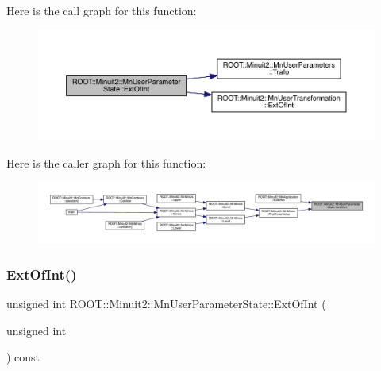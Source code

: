 Here is the call graph for this function\+:
\nopagebreak
\begin{figure}[H]
\begin{center}
\leavevmode
\includegraphics[width=350pt]{d3/de0/classROOT_1_1Minuit2_1_1MnUserParameterState_a9ab7bee2faaac9a607d090eb11926150_cgraph}
\end{center}
\end{figure}
Here is the caller graph for this function\+:
\nopagebreak
\begin{figure}[H]
\begin{center}
\leavevmode
\includegraphics[width=350pt]{d3/de0/classROOT_1_1Minuit2_1_1MnUserParameterState_a9ab7bee2faaac9a607d090eb11926150_icgraph}
\end{center}
\end{figure}
\mbox{\label{classROOT_1_1Minuit2_1_1MnUserParameterState_a9ab7bee2faaac9a607d090eb11926150}} 
\subsubsection{\texorpdfstring{ExtOfInt()}{ExtOfInt()}\hspace{0.1cm}{\footnotesize\ttfamily [3/3]}}
{\footnotesize\ttfamily unsigned int R\+O\+O\+T\+::\+Minuit2\+::\+Mn\+User\+Parameter\+State\+::\+Ext\+Of\+Int (\begin{DoxyParamCaption}\item[{unsigned int}]{ }\end{DoxyParamCaption}) const}

\mbox{\label{classROOT_1_1Minuit2_1_1MnUserParameterState_a89b898660495dd7fb95bb1c398941e17}} 
